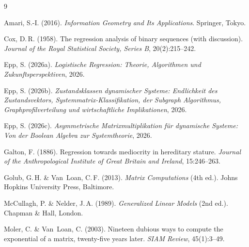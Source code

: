 ﻿\documentclass[12pt, a4paper]{article}
\theoremstyle{definition}
\theoremstyle{remark}
\begin{document}

\begin{thebibliography}{9}

Amari, S.-I. (2016).
\newblock \textit{Information Geometry and Its Applications}.
\newblock Springer, Tokyo.

Cox, D.\,R. (1958).
\newblock The regression analysis of binary sequences (with discussion).
\newblock \textit{Journal of the Royal Statistical Society, Series B}, 20(2):215--242.

Epp, S. (2026a).
\newblock \textit{Logistische Regression: Theorie, Algorithmen und
  Zukunftsperspektiven}, 2026.

Epp, S. (2026b).
\newblock \textit{Zustandsklassen dynamischer Systeme: Endlichkeit des
  Zustandsvektors, Systemmatrix-Klassifikation, der Subgraph Algorithmus,
  Graphprofilverteilung und wirtschaftliche Implikationen}, 2026.

Epp, S. (2026c).
\newblock \textit{Asymmetrische Matrixmultiplikation für dynamische Systeme:
  Von der Boolean Algebra zur Systemtheorie}, 2026.

Galton, F. (1886).
\newblock Regression towards mediocrity in hereditary stature.
\newblock \textit{Journal of the Anthropological Institute of Great Britain and
  Ireland}, 15:246--263.

Golub, G.\,H. \& Van~Loan, C.\,F. (2013).
\newblock \textit{Matrix Computations} (4th ed.).
\newblock Johns Hopkins University Press, Baltimore.

McCullagh, P. \& Nelder, J.\,A. (1989).
\newblock \textit{Generalized Linear Models} (2nd ed.).
\newblock Chapman \& Hall, London.

Moler, C. \& Van~Loan, C. (2003).
\newblock Nineteen dubious ways to compute the exponential of a matrix,
  twenty-five years later.
\newblock \textit{SIAM Review}, 45(1):3--49.


\end{thebibliography}
\end{document}
